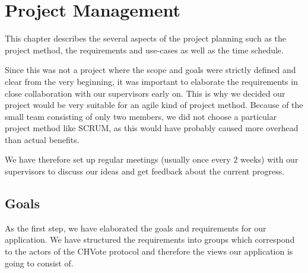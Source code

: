 
\newcommand{\zs}[0]{\cellcolor{zscol}}				%
\newcommand{\zi}[0]{\cellcolor{zicol}}				%
\newcommand{\ms}[1]{
	\makebox[.7cm][r]{
		\tikz[baseline=(char.base)]{
			\node[shape=circle,draw,inner sep=.02cm,fill=black,text=white] (char) { #1 };
		}
	}
}

\newcommand{\sq}[1]{\textcolor{#1}{\rule{.3cm}{.3cm}}}

\newcommand{\phase}[1]{
	\multicolumn{22}{l}{} \\
	\multicolumn{22}{l}{\cellcolor{gray!20}\textbf{#1}} \\ \hline
}

\chapter{Project Management}
This chapter describes the several aspects of the project planning such as the project method, the requirements and use-cases as well as the time schedule.

Since this was not a project where the scope and goals were strictly defined and clear from the very beginning, it was important to elaborate the requirements in close collaboration with our supervisors early on. This is why we decided our project would be very suitable for an agile kind of project method. Because of the small team consisting of only two members, we did not choose a particular project method like SCRUM, as this would have probably caused more overhead than actual benefits.

We have therefore set up regular meetings (usually once every 2 weeks) with our supervisors to discuss our ideas and get feedback about the current progress.

\section{Goals}
As the first step, we have elaborated the goals and requirements for our application. We have structured the requirements into groups which correspond to the actors of the CHVote protocol and therefore the views our application is going to consist of.


